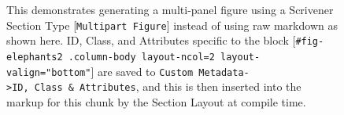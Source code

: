 \documentclass[
  12pt,
  a4paper,
  oneside,
  titlepage,
  toclink=all,
  toc=bibliography]{scrbook}
\theoremstyle{definition}
\theoremstyle{plain}
\theoremstyle{plain}
\theoremstyle{plain}
\theoremstyle{plain}
\theoremstyle{definition}
\theoremstyle{definition}
\theoremstyle{plain}
\theoremstyle{remark}
\begin{document}
\begin{figure}

\begin{minipage}[t]{0.45\linewidth}

{\centering 


}

\end{minipage}%
%
\begin{minipage}[t]{0.56\linewidth}

{\centering 


}

\end{minipage}%

\caption{\label{fig-scriv25}This demonstrates generating a multi-panel
figure using a Scrivener Section Type {[}\texttt{Multipart\ Figure}{]}
instead of using raw markdown as shown here. ID, Class, and Attributes
specific to the block
{[}\texttt{\#fig-elephants2\ .column-body\ layout-ncol=2\ layout-valign="bottom"}{]}
are saved to
\texttt{Custom\ Metadata-\textgreater{}ID,\ Class\ \&\ Attributes}, and
this is then inserted into the markup for this chunk by the Section
Layout at compile time.}

\end{figure}
\end{document}
